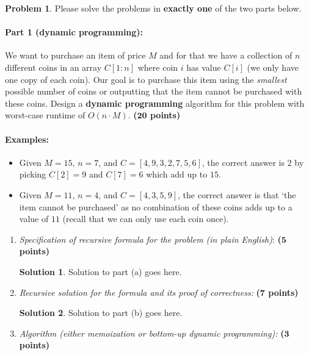 \documentclass{article}
\theoremstyle{definition}
\newtheorem{problem}{Problem}
\newtheorem*{solution*}{Solution}
\newenvironment{solution}{\begin{solution*}}{{} \end{solution*}}
\newcommand{\grade}[1]{\hfill{\textbf{($\mathbf{#1}$ points)}}}
\begin{document}
\newpage
\begin{problem}\label{DP-greedy}
Please solve the problems in \textbf{exactly one} of the two parts below. 

\paragraph{Part 1 (dynamic programming):} We want to purchase an item of price $M$ and for that we have a collection of $n$ different coins in an array $C[1:n]$ where coin $i$ has value $C[i]$ (we only have one copy of each coin).  
	Our goal is to purchase this item using the \emph{smallest} possible number of coins or outputting that the item cannot be purchased with these coins. 
	Design a \textbf{dynamic programming} algorithm for this problem with worst-case runtime of $O(n \cdot M)$. \grade{20}
	
	\paragraph{Examples:}
	\begin{itemize}
		\item Given $M=15$, $n=7$, and $C = [4,9,3,2,7,5,6]$, the correct answer is $2$ by picking $C[2]=9$ and $C[7]=6$ which add up to $15$. 
		\item Given $M=11$, $n=4$, and $C = [4,3,5,9]$, the correct answer is that `the item cannot be purchased' as no combination of these coins adds up to a value of $11$ (recall that we can only use each coin once). 
	\end{itemize}
	
	\begin{enumerate}[label=(\alph*)]
	\item \emph{Specification of recursive formula for the problem (in plain English)}: \grade{5}
	
	\bigskip	
	\begin{solution}
	Solution to part (a) goes here. 
	\end{solution}
	
	
	\item \emph{Recursive solution for the formula and its proof of correctness:} \grade{7}
	
	\bigskip	
	\begin{solution}
	Solution to part (b) goes here. 
	\end{solution}
	
	
	\newpage
	\item \emph{Algorithm (either memoization or bottom-up dynamic programming):} \grade{3}
	

\end{enumerate}
\end{problem}
\end{document}
